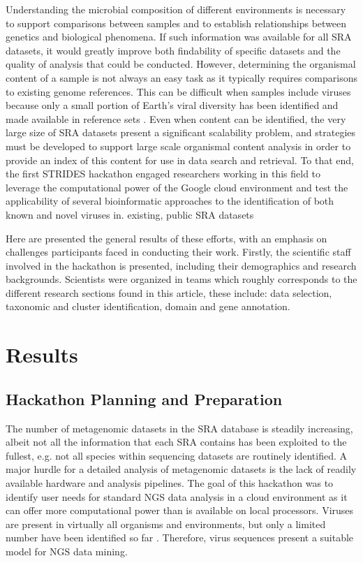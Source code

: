 \documentclass[genes, moreauthors]{Definitions/mdpi}
\begin{document}
  Understanding the microbial composition of different environments is
  necessary to support comparisons between samples and to establish
  relationships between genetics and biological phenomena. If such information
  was available for all SRA datasets, it would greatly improve both findability
  of specific datasets and the quality of analysis that could be conducted.
  However, determining the organismal content of a sample is not always an easy
  task as it typically requires comparisons to existing genome references. This
  can be difficult when samples include viruses because only a small portion of
  Earth’s viral diversity has been identified and made available in reference
  sets \cite{Carroll2018}. Even when content can be identified, the very large
  size of SRA datasets present a significant scalability problem, and
  strategies must be developed to support large scale organismal content
  analysis in order to provide an index of this content for use in data search
  and retrieval. To that end, the first STRIDES hackathon engaged researchers
  working in this field to leverage the computational power of the Google cloud
  environment and test the applicability of several bioinformatic approaches to
  the identification of both known and novel viruses in.   existing, public SRA
  datasets

  Here are presented the general results of these efforts, with an emphasis on
  challenges participants faced in conducting their work. Firstly, the
  scientific staff involved in the hackathon is presented, including their
  demographics and research backgrounds. Scientists were organized in teams
  which roughly corresponds to the different research sections found in this
  article, these include: data selection, taxonomic and cluster identification,
  domain and gene annotation.

\section{Results}

  \subsection{Hackathon Planning and Preparation}
  The number of metagenomic datasets in the SRA database is steadily
  increasing, albeit not all the information that each SRA contains has been
  exploited to the fullest, e.g. not all species within sequencing datasets are
  routinely identified. A major hurdle for a detailed analysis of metagenomic
  datasets is the lack of readily available hardware and analysis pipelines.
  The goal of this hackathon was to identify user needs for  standard NGS data
  analysis in a cloud environment as it can offer more computational power than
  is available on local processors. Viruses are present in virtually all
  organisms and environments, but only a limited number have been identified so
  far \cite{Shi2016}. Therefore, virus sequences present a suitable model for
  NGS data mining.
\end{document}
